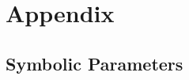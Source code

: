 \documentclass[12pt]{article}
\begin{document}

				




\newpage

\section{Appendix}

\subsection{Symbolic Parameters}
\end{document}

